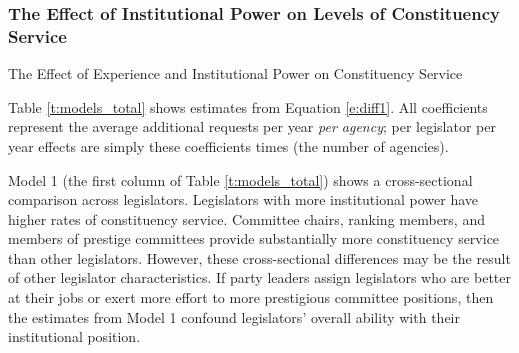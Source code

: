 \documentclass[12pt]{article}
\begin{document}
\subsubsection{The Effect of Institutional Power on Levels of Constituency Service}\label{s:prestigeresults}

\begin{table}[hbt!]
\caption{The Effect of Experience and Institutional Power on Constituency Service} \label{t:models_total}
\begin{minipage}{\textwidth}
\begin{center}
\end{center}
\end{minipage}
\end{table}

Table \ref{t:models_total} shows estimates from Equation \ref{e:diff1}. All coefficients represent the average additional requests per year \textit{per agency}; per legislator per year effects are simply these coefficients times  (the number of agencies).



Model 1 (the first column of Table \ref{t:models_total}) shows a cross-sectional comparison across legislators. Legislators with more institutional power have higher rates of constituency service. %
Committee chairs, ranking members, and members of prestige committees %
provide substantially more constituency service than other legislators. However, these cross-sectional differences may be the result of other legislator characteristics. If party leaders assign legislators who are better at their jobs or exert more effort to more prestigious committee positions, then the estimates from Model 1 confound legislators' overall ability with their institutional position.   
\end{document}
